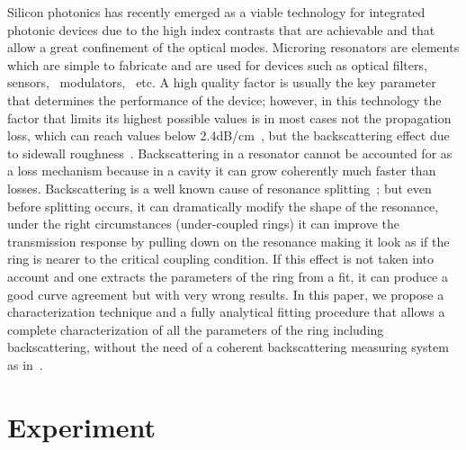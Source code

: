 \documentclass[10pt,letterpaper]{article}
\begin{document}
Silicon photonics has recently emerged as a viable technology for integrated photonic devices due to the high index contrasts that are achievable and that allow a great confinement of the optical modes. Microring resonators are elements which are simple to fabricate and are used for devices such as optical filters,~\cite{Little1998} sensors,~\cite{DeVos2007} modulators,~\cite{So2004} etc. A high quality factor is usually the key parameter that determines the performance of the device; however, in this technology the factor that limits its highest possible values is in most cases not the propagation loss, which can reach values below 2.4dB/cm~\cite{Dumon2004}, but the backscattering effect due to sidewall roughness~\cite{Morichetti2010a}. Backscattering in a resonator cannot be accounted for as a loss mechanism because in a cavity it can grow coherently much faster than losses. Backscattering is a well known cause of resonance splitting~\cite{Little1997a,Kippenberg2002}; but even before splitting occurs, it can dramatically modify the shape of the resonance, under the right circumstances (under-coupled rings) it can improve the transmission response by pulling down on the resonance making it look as if the ring is nearer to the critical coupling condition. If this effect is not taken into account and one extracts the parameters of the ring from a fit, it can produce a good curve agreement but with very wrong results.  In this paper, we propose a characterization technique and a fully analytical fitting procedure that allows a complete characterization of all the parameters of the ring including backscattering, without the need of a coherent backscattering measuring system as in~\cite{Morichetti2010a,Morichetti2010b}.

\section{Experiment}
\end{document}
